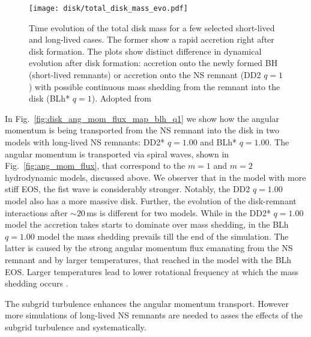 \begin{figure}[t]
    \centering 
    \texttt{[image: disk/total\_disk\_mass\_evo.pdf]}
    \caption{Time evolution of the total disk mass for a few selected
        short-lived and long-lived cases. The former show a rapid 
        accretion right after disk formation. The plots show
        distinct difference in dynamical evolution after disk formation: accretion onto
        the newly formed BH (short-lived remnants) or accretion onto the NS
        remnant (DD2 $q=1$) with possible continuous mass shedding from the remnant
        into the disk (BLh* $q=1$). Adopted from \citet{Nedora:2020pak}
    } 
    \label{fig:disk_mass_evo}
\end{figure}

In Fig.~\ref{fig:disk_ang_mom_flux_map_blh_q1} we show how the angular momentum is 
being transported from the \ac{NS} remnant into the disk 
in two models with long-lived 
\ac{NS} remnants: %
DD2* $q=1.00$ and BLh* $q=1.00$.
%
%
The angular momentum is transported via spiral waves, 
shown in Fig.~\ref{fig:ang_mom_flux}, that correspond to the 
$m=1$ and $m=2$ hydrodynamic models, discussed above.
We observer that in the model with more stiff \ac{EOS}, %
the fist wave is considerably stronger. Notably, 
the DD2 $q=1.00$ model 
also has a more massive disk.
%
Further, the evolution of the disk-remnant interactions after ${\sim}20\,$ms \pmerg{} 
is different for two models. While in the DD2* $q=1.00$ model the 
accretion takes starts to dominate over mass shedding,
in the BLh $q=1.00$ model the mass shedding prevails till 
the end of the simulation.
%
The latter is caused by the strong angular momentum flux 
emanating from the \ac{NS} remnant and by larger temperatures, 
that reached in the model with the BLh \ac{EOS}.
%
Larger temperatures lead to lower rotational frequency at which the mass 
shedding occurs \citep{Kaplan:2013wra}. 

The subgrid turbulence enhances the angular momentum transport. However more simulations of long-lived 
\ac{NS} remnants are needed to asses the effects of the 
subgrid turbulence and \mr{} systematically. 




